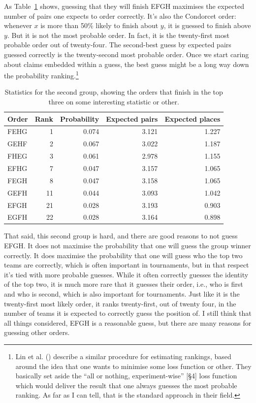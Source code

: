 \documentclass[
  11pt,
  letterpaper,
  DIV=11,
  numbers=noendperiod,
  twoside]{scrartcl}
\begin{document}
As Table~\ref{tbl-high-variance-orders} shows, guessing that they will
finish EFGH maximises the expected number of pairs one expects to order
correctly. It's also the Condorcet order: whenever \(x\) is more than
50\% likely to finish about \(y\), it is guessed to finish above \(y\).
But it is not the most probable order. In fact, it is the twenty-first
most probable order out of twenty-four. The second-best guess by
expected pairs guessed correctly is the twenty-second most probable
order. Once we start caring about claims embedded within a guess, the
best guess might be a long way down the probability ranking.\footnote{
  Lin et al. () describe a similar
  procedure for estimating rankings, based around the idea that one
  wants to minimise some loss function or other. They basically set
  aside the ``all or nothing, experiment-wise'' {[}§4{]} loss function
  which would deliver the result that one always guesses the most
  probable ranking. As far as I can tell, that is the standard approach
  in their field.}

{

\begin{longtable}[]{@{}lrrrr@{}}

\caption{\label{tbl-high-variance-orders}Statistics for the second
group, showing the orders that finish in the top three on some
interesting statistic or other.}

\tabularnewline

\toprule\noalign{}
Order & Rank & Probability & Expected pairs & Expected places \\
\midrule\noalign{}
\endhead
\bottomrule\noalign{}
\endlastfoot
FEHG & 1 & 0.074 & 3.121 & 1.227 \\
GEHF & 2 & 0.067 & 3.022 & 1.187 \\
FHEG & 3 & 0.061 & 2.978 & 1.155 \\
EFHG & 7 & 0.047 & 3.157 & 1.065 \\
FEGH & 8 & 0.047 & 3.158 & 1.065 \\
GEFH & 11 & 0.044 & 3.093 & 1.042 \\
EFGH & 21 & 0.028 & 3.193 & 0.903 \\
EGFH & 22 & 0.028 & 3.164 & 0.898 \\

\end{longtable}

}

That said, this second group is hard, and there are good reasons to not
guess EFGH. It does not maximise the probability that one will guess the
group winner correctly. It does maximise the probability that one will
guess who the top two teams are correctly, which is often important in
tournaments, but in that respect it's tied with more probable guesses.
While it often correctly guesses the identity of the top two, it is much
more rare that it guesses their order, i.e., who is first and who is
second, which is also important for tournaments. Just like it is the
twenty-first most likely order, it ranks twenty-first, out of twenty
four, in the number of teams it is expected to correctly guess the
position of. I still think that all things considered, EFGH is a
reasonable guess, but there are many reasons for guessing other orders.
\end{document}
